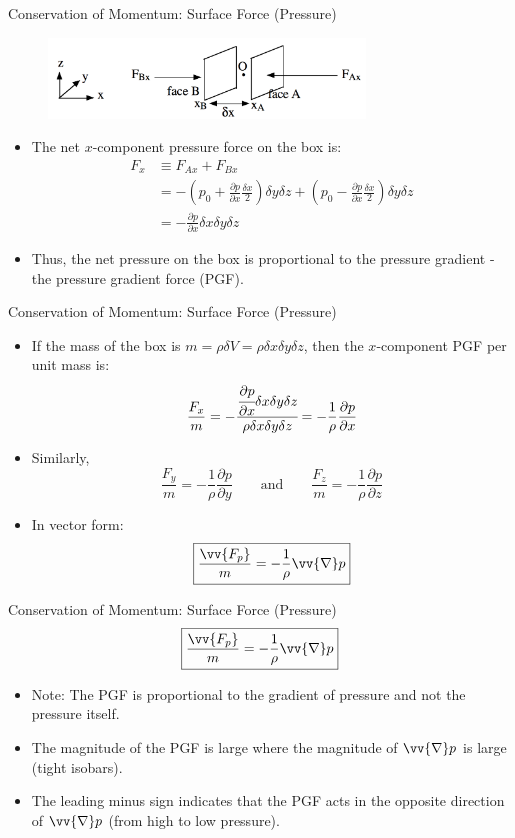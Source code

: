 \begin{frame}{Conservation of Momentum: Surface Force (Pressure)}
\begin{figure}
		\includegraphics[width=0.75\textwidth]{pressure2.png}	
	\end{figure}
\begin{itemize}
	\item The net $x$-component pressure force on the box is:
	\begin{align*}
		F_x &\equiv F_{Ax} + F_{Bx}\\
		&= 	-\left(p_0 + \frac{\partial p}{\partial x}\frac{\delta x}{2}\right)\delta y \delta z + \left(p_0 - \frac{\partial p}{\partial x}\frac{\delta x}{2}\right)\delta y \delta z\\
		&= -\frac{\partial p}{\partial x}\delta x \delta y \delta z
	\end{align*}
	\item Thus, the net pressure on the box is proportional to the pressure gradient - the pressure gradient force (PGF).
\end{itemize}
\end{frame}
\begin{frame}{Conservation of Momentum: Surface Force (Pressure)}
\begin{itemize}
	\item If the mass of the box is $m=\rho \delta V = \rho \delta x \delta y \delta z$, then the $x$-component PGF per unit mass is:
	$$\frac{F_x}{m} = -\cfrac{\cfrac{\partial p}{\partial x}\delta x \delta y \delta z}{\rho \delta x \delta y \delta z} = -\frac{1}{\rho}\frac{\partial p}{\partial x}$$
	\item Similarly,
	$$\frac{F_y}{m} = -\frac{1}{\rho}\frac{\partial p}{\partial y} \qquad \text{and} \qquad \frac{F_z}{m} = -\frac{1}{\rho}\frac{\partial p}{\partial z}$$
	\item In vector form:
	$$\boxed{\frac{\vv{F_p}}{m} = -\frac{1}{\rho} \vv{\nabla} p}$$
\end{itemize}
\end{frame}
\begin{frame}{Conservation of Momentum: Surface Force (Pressure)}
$$\boxed{\frac{\vv{F_p}}{m} = -\frac{1}{\rho} \vv{\nabla} p}$$
\begin{itemize}
	\item Note: The PGF is proportional to the gradient of pressure and not the pressure itself.
	\item The magnitude of the PGF is large where the magnitude of $\vv{\nabla}p$ is large (tight isobars).
	\item The leading minus sign indicates that the PGF acts in the opposite direction of $\vv{\nabla}p$ (from high to low pressure).
\end{itemize}
\end{frame}
